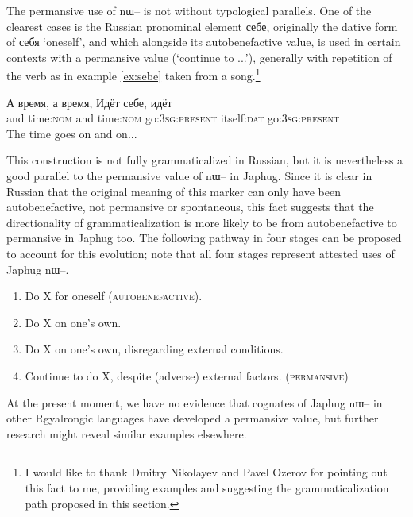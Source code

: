 \documentclass[oldfontcommands,oneside,a4paper,11pt]{article}
\newcommand{\ipa}[1]{{\phon \mbox{#1}}} %
\begin{document}
%

The permansive use of \ipa{nɯ--} is not without typological parallels. One of the clearest cases is the Russian pronominal element \ipa{себе}, originally the dative form of \ipa{себя} `oneself', and which alongside its autobenefactive value,  is used in certain contexts with a permansive value (`continue to ...'), generally with repetition of the verb as in example \ref{ex:sebe} taken from a song.\footnote{I would like to thank Dmitry Nikolayev and Pavel Ozerov for pointing out this fact to me, providing examples and suggesting the grammaticalization path proposed in this section.}
 
\begin{exe}
 \ex \label{ex:sebe}
 \gll
\ipa{А} 	\ipa{время,} 	\ipa{а} 	\ipa{время,} 	\ipa{Идёт} 	\ipa{себе,} 	\ipa{идёт} \\
 and time:\textsc{nom}  and time:\textsc{nom}  go:\textsc{3sg:present} itself:\textsc{dat} go:\textsc{3sg:present} \\
\glt The time goes on and on...
 \end{exe}

This construction is not fully grammaticalized in Russian, but it is nevertheless a good parallel to the permansive value of \ipa{nɯ--} in Japhug. Since it is clear in Russian that the original meaning of this marker can only have been autobenefactive, not permansive or spontaneous, this fact suggests that the directionality of grammaticalization is more likely to be from autobenefactive to permansive in Japhug too. The following pathway in four stages can be proposed to account for this evolution; note that all four stages represent attested uses of Japhug \ipa{nɯ--}.

\begin{enumerate}
\item Do X for oneself (\textsc{autobenefactive}).  
\item Do X on one's own.
\item Do X on one's own, disregarding external conditions.
\item Continue to do X, despite (adverse) external factors. (\textsc{permansive})
\end{enumerate}
 
At the present moment, we have no evidence that cognates of Japhug \ipa{nɯ--} in other Rgyalrongic languages have developed a permansive value, but further research might reveal similar examples elsewhere.
\end{document}
